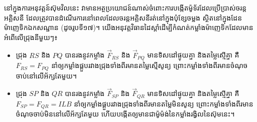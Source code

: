 
\noindent
\begin{minipage}[t]{0.55\textwidth}
	\raggedright
	នៅក្នុងការអនុវត្តន៍ស៊ុមវិលនេះ វាមានអត្ថប្រយោជន៍ណាស់ចំពោះការបង្កើតម៉ូទ័រដែលប្រើប្រាស់ចរន្តអគ្គិសនី ដែលត្រូវបានដំណើរការនៅពេលដែលចរន្តអគ្គិសនីរត់នៅក្នុងបុំខ្សែចម្លង ស្ថិតនៅក្នុងដែនម៉ាញេទិកឯកសណ្ឋាន (ដូចរូបទី១៧)។ យើងអនុវត្តវិធានដៃស្តាំដើម្បីកំណត់កម្លាំងម៉ាញេទិកដែលមានអំពើលើជ្រុងនីមួយៗ៖
\end{minipage}%
\hfill
\begin{minipage}[t]{0.40\textwidth}
	\vspace{0pt}
	\hspace*{0.5em}%
\end{minipage}

\vspace{0.7em}
\begin{itemize}[itemsep=2pt, topsep=2pt, parsep=0pt, leftmargin=1.6em]
	\item ជ្រុង $RS$ និង $PQ$ បានរងនូវកម្លាំង $\vec{F}_{RS}$ និង $\vec{F}_{PQ}$ មានទិសដៅផ្ទុយគ្នា និងតម្លៃស្មើគ្នា គឺ $F_{RS} = F_{PQ}$ នាំឲ្យកម្លាំងផ្គួបរវាងជ្រុងទាំងពីរមានតម្លៃស្មើសូន្យ ព្រោះកម្លាំងទាំងពីរមានចំណុចចាប់នៅលើអ័ក្សតែមួយ។
	\item ជ្រុង $SP$ និង $QR$ បានរងនូវកម្លាំង $\vec{F}_{SP}$ និង $\vec{F}_{QR}$ មានទិសដៅផ្ទុយគ្នា និងតម្លៃស្មើគ្នា គឺ $F_{SP} = F_{QR} = ILB$ នាំឲ្យកម្លាំងផ្គួបរវាងជ្រុងទាំងពីរមានតម្លៃមិនសូន្យ ព្រោះកម្លាំងទាំងពីរមានចំណុចចាប់មិននៅលើអ័ក្សតែមួយ ហើយបង្កើតឲ្យមានជាម៉ូម៉ង់នៃកម្លាំងរង្វិលនៃស៊ុមនេះ។
\end{itemize}



